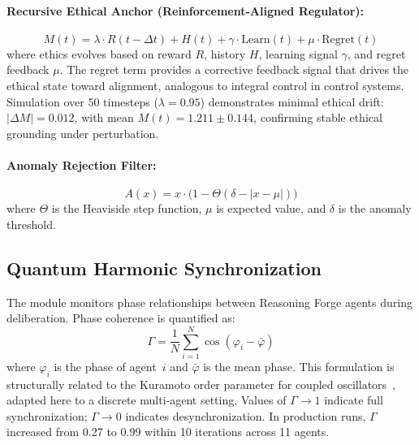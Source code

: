 \documentclass[11pt,a4paper]{article}
\begin{document}
\paragraph{Recursive Ethical Anchor (Reinforcement-Aligned Regulator):}
\begin{equation}
  M(t) = \lambda \cdot R(t - \Delta t) + H(t) + \gamma \cdot \text{Learn}(t) + \mu \cdot \text{Regret}(t)
  \label{eq:ethical_anchor}
\end{equation}
where ethics evolves based on reward $R$, history $H$, learning signal $\gamma$, and regret feedback $\mu$. The regret term provides a corrective feedback signal that drives the ethical state toward alignment, analogous to integral control in control systems. Simulation over 50 timesteps ($\lambda = 0.95$) demonstrates minimal ethical drift: $|\Delta M| = 0.012$, with mean $M(t) = 1.211 \pm 0.144$, confirming stable ethical grounding under perturbation.

\paragraph{Anomaly Rejection Filter:}
\begin{equation}
  A(x) = x \cdot \bigl(1 - \Theta(\delta - |x - \mu|)\bigr)
  \label{eq:anomaly}
\end{equation}
where $\Theta$ is the Heaviside step function, $\mu$ is expected value, and $\delta$ is the anomaly threshold.

\subsection{Quantum Harmonic Synchronization}
The module monitors phase relationships between Reasoning Forge agents during deliberation. Phase coherence is quantified as:
\begin{equation}
  \Gamma = \frac{1}{N} \sum_{i=1}^{N} \cos(\varphi_i - \bar{\varphi})
  \label{eq:coherence}
\end{equation}
where $\varphi_i$ is the phase of agent~$i$ and $\bar{\varphi}$ is the mean phase. This formulation is structurally related to the Kuramoto order parameter for coupled oscillators~\citep{kuramoto1984chemical,acebron2005kuramoto}, adapted here to a discrete multi-agent setting. Values of $\Gamma \to 1$ indicate full synchronization; $\Gamma \to 0$ indicates desynchronization. In production runs, $\Gamma$ increased from 0.27 to 0.99 within 10 iterations across 11 agents.

\end{document}
